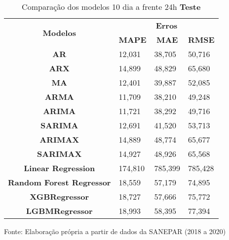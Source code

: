\begin{table}[H]
	\centering
	\caption{Comparação dos modelos 10 dia a frente 24h \textbf{Teste} }\label{tb:10-24tst}
	\begin{tabular}{@{}clll@{}}
		\toprule
		\multirow{2}{*}{\textbf{Modelos}} & \multicolumn{3}{c}{\textbf{Erros}}                                                                       \\ \cmidrule(l){2-4} 
		& \multicolumn{1}{c}{\textbf{MAPE}} & \multicolumn{1}{c}{\textbf{MAE}} & \multicolumn{1}{c}{\textbf{RMSE}} \\ \hline
\textbf{AR}                       & 12,031                            & 38,705                           & 50,716                            \\
\textbf{ARX}                      & 14,899                            & 48,829                           & 65,680                            \\
\textbf{MA}                       & 12,401                            & 39,887                           & 52,085                            \\
\textbf{ARMA}                     & 11,709                            & 38,210                           & 49,248                            \\
\textbf{ARIMA}                    & 11,721                            & 38,292                           & 49,716                            \\
\textbf{SARIMA}                   & 12,691                            & 41,520                           & 53,713                            \\
\textbf{ARIMAX}                   & 14,889                            & 48,774                           & 65,677                            \\
\textbf{SARIMAX}                  & 14,927                            & 48,926                           & 65,568                            \\
\textbf{Linear Regression}        & 174,810                           & 785,399                          & 785,428                           \\
\textbf{Random Forest Regressor}  & 18,559                            & 57,179                           & 74,895                            \\
\textbf{XGBRegressor}             & 18,727                            & 57,666                           & 75,772                            \\
\textbf{LGBMRegressor}            & 18,993                            & 58,395                           & 77,394                            \\ \bottomrule
	\end{tabular}

Fonte: Elaboração própria a partir de dados da SANEPAR (2018 a 2020)
\end{table}

